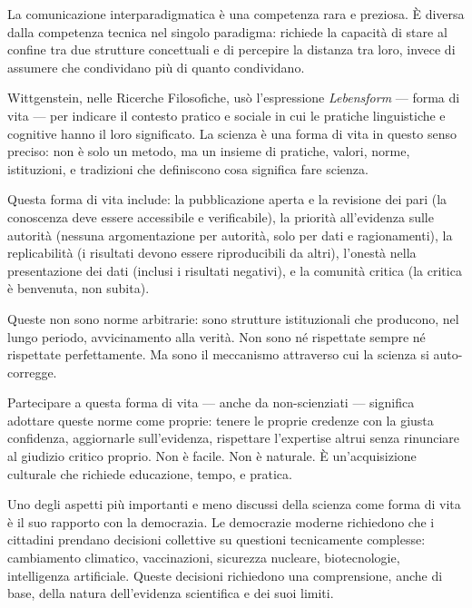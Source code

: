 \documentclass[12pt,a4paper,openany]{book}
\newcommand{\sezione}[1]{\vspace{1.2em}{\large\bfseries #1}\vspace{0.5em}\par}
\begin{document}
La comunicazione interparadigmatica è una competenza rara e preziosa. È diversa dalla competenza tecnica nel singolo paradigma: richiede la capacità di stare al confine tra due strutture concettuali e di percepire la distanza tra loro, invece di assumere che condividano più di quanto condividano.

\sezione{La scienza come forma di vita}

Wittgenstein, nelle Ricerche Filosofiche, usò l'espressione \textit{Lebensform} --- forma di vita --- per indicare il contesto pratico e sociale in cui le pratiche linguistiche e cognitive hanno il loro significato. La scienza è una forma di vita in questo senso preciso: non è solo un metodo, ma un insieme di pratiche, valori, norme, istituzioni, e tradizioni che definiscono cosa significa fare scienza.

Questa forma di vita include: la pubblicazione aperta e la revisione dei pari (la conoscenza deve essere accessibile e verificabile), la priorità all'evidenza sulle autorità (nessuna argomentazione per autorità, solo per dati e ragionamenti), la replicabilità (i risultati devono essere riproducibili da altri), l'onestà nella presentazione dei dati (inclusi i risultati negativi), e la comunità critica (la critica è benvenuta, non subita).

Queste non sono norme arbitrarie: sono strutture istituzionali che producono, nel lungo periodo, avvicinamento alla verità. Non sono né rispettate sempre né rispettate perfettamente. Ma sono il meccanismo attraverso cui la scienza si auto-corregge.

Partecipare a questa forma di vita --- anche da non-scienziati --- significa adottare queste norme come proprie: tenere le proprie credenze con la giusta confidenza, aggiornarle sull'evidenza, rispettare l'expertise altrui senza rinunciare al giudizio critico proprio. Non è facile. Non è naturale. È un'acquisizione culturale che richiede educazione, tempo, e pratica.

\sezione{La scienza in una democrazia}

Uno degli aspetti più importanti e meno discussi della scienza come forma di vita è il suo rapporto con la democrazia. Le democrazie moderne richiedono che i cittadini prendano decisioni collettive su questioni tecnicamente complesse: cambiamento climatico, vaccinazioni, sicurezza nucleare, biotecnologie, intelligenza artificiale. Queste decisioni richiedono una comprensione, anche di base, della natura dell'evidenza scientifica e dei suoi limiti.
\end{document}

